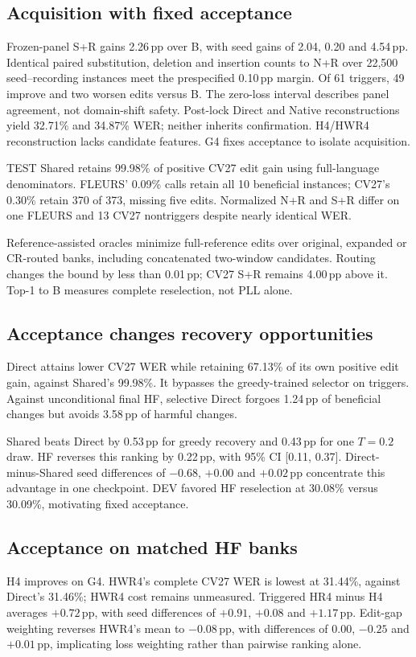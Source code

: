 \subsection{Acquisition with fixed acceptance}

Frozen-panel S+R gains 2.26\,pp over B, with seed gains of 2.04, 0.20 and 4.54\,pp. Identical paired substitution, deletion and insertion counts to N+R over 22,500 seed--recording instances meet the prespecified 0.10\,pp margin. Of 61 triggers, 49 improve and two worsen edits versus B. The zero-loss interval describes panel agreement, not domain-shift safety. Post-lock Direct and Native reconstructions yield 32.71\% and 34.87\% WER; neither inherits confirmation. H4/HWR4 reconstruction lacks candidate features. G4 fixes acceptance to isolate acquisition.

TEST Shared retains 99.98\% of positive CV27 edit gain using full-language denominators. FLEURS' 0.09\% calls retain all 10 beneficial instances; CV27's 0.30\% retain 370 of 373, missing five edits. Normalized N+R and S+R differ on one FLEURS and 13 CV27 nontriggers despite nearly identical WER.

Reference-assisted oracles minimize full-reference edits over original, expanded or CR-routed banks, including concatenated two-window candidates. Routing changes the bound by less than 0.01\,pp; CV27 S+R remains 4.00\,pp above it. Top-1 to B measures complete reselection, not PLL alone.

\subsection{Acceptance changes recovery opportunities}
Direct attains lower CV27 WER while retaining 67.13\% of its own positive edit gain, against Shared's 99.98\%. It bypasses the greedy-trained selector on triggers. Against unconditional final HF, selective Direct forgoes 1.24\,pp of beneficial changes but avoids 3.58\,pp of harmful changes.

Shared beats Direct by 0.53\,pp for greedy recovery and 0.43\,pp for one $T=0.2$ draw. HF reverses this ranking by 0.22\,pp, with 95\% CI [0.11, 0.37]. Direct-minus-Shared seed differences of $-0.68$, $+0.00$ and $+0.02$\,pp concentrate this advantage in one checkpoint. DEV favored HF reselection at 30.08\% versus 30.09\%, motivating fixed acceptance.

\subsection{Acceptance on matched HF banks}

H4 improves on G4. HWR4's complete CV27 WER is lowest at 31.44\%, against Direct's 31.46\%; HWR4 cost remains unmeasured. Triggered HR4 minus H4 averages $+0.72$\,pp, with seed differences of $+0.91$, $+0.08$ and $+1.17$\,pp. Edit-gap weighting reverses HWR4's mean to $-0.08$\,pp, with differences of $0.00$, $-0.25$ and $+0.01$\,pp, implicating loss weighting rather than pairwise ranking alone.

